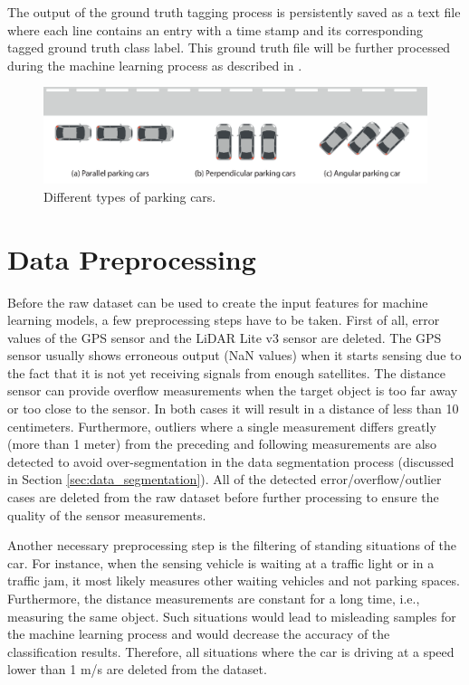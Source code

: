 The output of the ground truth tagging process is persistently saved as a text file where each line contains an entry with a time stamp and its corresponding tagged ground truth class label. This ground truth file will be further processed during the machine learning process as described in .


\begin{figure}
	\centering
	\includegraphics[width=\textwidth]{img/types-of-parking-cars.eps}
	\caption{Different types of parking cars.}
	\label{fig:types_of_parking_cars}
\end{figure}


\section{Data Preprocessing}
\label{sec:data_preprocessing}

Before the raw dataset can be used to create the input features for machine learning models, a few preprocessing steps have to be taken. First of all, error values of the GPS sensor and the LiDAR Lite v3 sensor are deleted. The GPS sensor usually shows erroneous output (NaN values) when it starts sensing due to the fact that it is not yet receiving signals from enough satellites. The distance sensor can provide overflow measurements when the target object is too far away or too close to the sensor. In both cases it will result in a distance of less than 10 centimeters. Furthermore, outliers where a single measurement differs greatly (more than 1 meter) from the preceding and following measurements are also detected to avoid over-segmentation in the data segmentation process (discussed in Section \ref{sec:data_segmentation}). All of the detected error/overflow/outlier cases are deleted from the raw dataset before further processing to ensure the quality of the sensor measurements.

Another necessary preprocessing step is the filtering of standing situations of the car. For instance, when the sensing vehicle is waiting at a traffic light or in a traffic jam, it most likely measures other waiting vehicles and not parking spaces. Furthermore, the distance measurements are constant for a long time, i.e., measuring the same object. Such situations would lead to misleading samples for the machine learning process and would decrease the accuracy of the classification results. Therefore, all situations where the car is driving at a speed lower than 1 m/s are deleted from the dataset.

